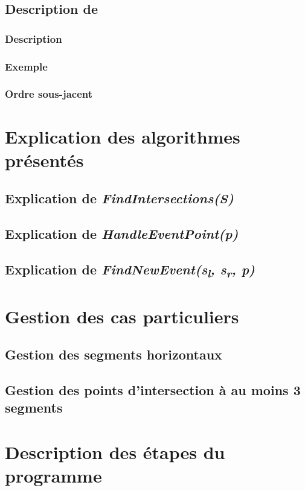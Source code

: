 \documentclass[]{article}
\begin{document}
\subsection{Description de }\label{sub:mainTDesc}
\subsubsection{Description}\label{subsub:TDesc}
\subsubsection{Exemple}\label{subsub:TEx}
\subsubsection{Ordre sous-jacent}\label{subsub:TOrd}

\section{Explication des algorithmes présentés}\label{sec:algos}
\subsection{Explication de \emph{FindIntersections(S)}}\label{sub:findInter}
\subsection{Explication de \emph{HandleEventPoint(p)}}\label{sub:eventPoint}
\subsection{Explication de \emph{FindNewEvent(s\textsubscript{l}, s\textsubscript{r}, p)}}\label{sub:findNew}

\section{Gestion des cas particuliers}\label{sec:part}
\subsection{Gestion des segments horizontaux}\label{sub:horiz}
\subsection{Gestion des points d'intersection à au moins 3 segments}\label{sub:interSeg}

\section{Description des étapes du programme}\label{sec:prog}
\end{document}
